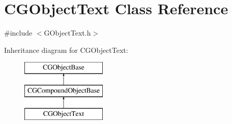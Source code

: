 \hypertarget{class_c_g_object_text}{}\section{C\+G\+Object\+Text Class Reference}
\label{class_c_g_object_text}


{\ttfamily \#include $<$G\+Object\+Text.\+h$>$}

Inheritance diagram for C\+G\+Object\+Text\+:\begin{figure}[H]
\begin{center}
\leavevmode
\includegraphics[height=3.000000cm]{class_c_g_object_text}
\end{center}
\end{figure}
